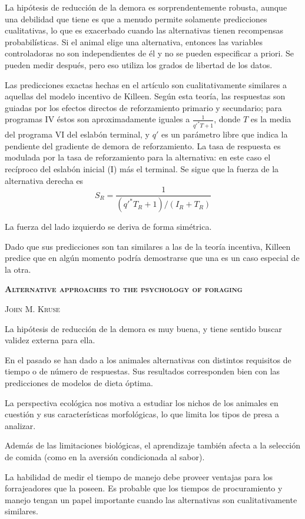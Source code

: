 \documentclass[a4paper,12pt]{article}
\begin{document}
La hipótesis de reducción de la demora es sorprendentemente robusta, aunque una debilidad que tiene es que a menudo permite solamente predicciones cualitativas, lo que es exacerbado cuando las alternativas tienen recompensas probabilísticas. Si el animal elige una alternativa, entonces las variables controladoras no son independientes de él y no se pueden especificar a priori. Se pueden medir después, pero eso utiliza los grados de libertad de los datos.

Las predicciones exactas hechas en el artículo son cualitativamente similares a aquellas del modelo incentivo de Killeen. Según esta teoría, las respuestas son guiadas por los efectos directos de reforzamiento primario y secundario; para programas IV éstos son aproximadamente iguales a $\frac{1}{q'^*T+1}$, donde $T$ es la media del programa VI del eslabón terminal, y $q'$ es un parámetro libre que indica la pendiente del gradiente de demora de reforzamiento. La tasa de respuesta es modulada por la tasa de reforzamiento para la alternativa: en este caso el recíproco del eslabón inicial (I) más el terminal. Se sigue que la fuerza de la alternativa derecha es
$$
S_{R}
=
\frac{
1
}{
(q'^*T_{R}+1)/(I_{R}+T_{R})
}
$$

La fuerza del lado izquierdo se deriva de forma simétrica.

Dado que sus predicciones son tan similares a las de la teoría incentiva, Killeen predice que en algún momento podría demostrarse que una es un caso especial de la otra.

{\scshape\bfseries Alternative approaches to the psychology of foraging}

{\scshape John M. Kruse}

La hipótesis de reducción de la demora es muy buena, y tiene sentido buscar validez externa para ella.

En el pasado se han dado a los animales alternativas con distintos requisitos de tiempo o de número de respuestas. Sus resultados corresponden bien con las predicciones de modelos de dieta óptima. 

La perspectiva ecológica nos motiva a estudiar los nichos de los animales en cuestión y sus características morfológicas, lo que limita los tipos de presa a analizar. 

Además de las limitaciones biológicas, el aprendizaje también afecta a la selección de comida (como en la aversión condicionada al sabor). 

La habilidad de medir el tiempo de manejo debe proveer ventajas para los forrajeadores que la poseen. Es probable que los tiempos de procuramiento y manejo tengan un papel importante cuando las alternativas son cualitativamente similares.
\end{document}
